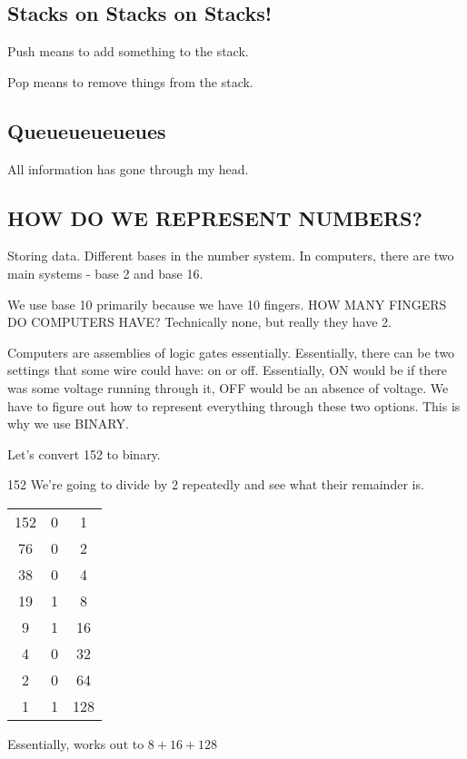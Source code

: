 \documentclass[12pt]{article}
\theoremstyle{definition}
\begin{document}
\subsection{Stacks on Stacks on Stacks!}
Push means to add something to the stack.

Pop means to remove things from the stack.
\subsection{Queueueueueues}
All information has gone through my head.

\subsection{HOW DO WE REPRESENT NUMBERS?}
Storing data. Different bases in the number system. In computers, there are two main systems - base 2 and base 16.

We use base 10 primarily because we have 10 fingers.
\note HOW MANY FINGERS DO COMPUTERS HAVE? Technically none, but really they have 2. 

Computers are assemblies of logic gates essentially. Essentially, there can be two settings that some wire could have: on or off. Essentially, ON would be if there was some voltage running through it, OFF would be an absence of voltage. We have to figure out how to represent everything through these two options. This is why we use BINARY.

Let's convert 152 to binary.

\begin{center}
    152
    \idea We're going to divide by 2 repeatedly and see what their remainder is. 
        \begin{center}
    \begin{tabular}{ | c | c | c | }
        \hline
        152 & 0 & 1\\
        76 & 0 & 2\\
        38 & 0 & 4\\
        19 & 1 & 8\\
        9 & 1 & 16\\
        4 & 0 & 32\\
        2 & 0 & 64\\
        1 & 1 & 128\\
        \hline
        
    \end{tabular}
\end{center} 
Essentially, works out to $8 + 16 + 128$
\end{center}
\end{document}

